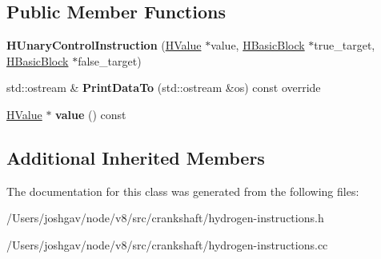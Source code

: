 \subsection*{Public Member Functions}
\begin{DoxyCompactItemize}
\item 
{\bfseries H\+Unary\+Control\+Instruction} (\hyperlink{classv8_1_1internal_1_1_h_value}{H\+Value} $\ast$value, \hyperlink{classv8_1_1internal_1_1_h_basic_block}{H\+Basic\+Block} $\ast$true\+\_\+target, \hyperlink{classv8_1_1internal_1_1_h_basic_block}{H\+Basic\+Block} $\ast$false\+\_\+target)\hypertarget{classv8_1_1internal_1_1_h_unary_control_instruction_ab4ddc5db204a0f1eab21b57189dea958}{}\label{classv8_1_1internal_1_1_h_unary_control_instruction_ab4ddc5db204a0f1eab21b57189dea958}

\item 
std\+::ostream \& {\bfseries Print\+Data\+To} (std\+::ostream \&os) const  override\hypertarget{classv8_1_1internal_1_1_h_unary_control_instruction_a1ca27e31ab76768681ce15c2f771503e}{}\label{classv8_1_1internal_1_1_h_unary_control_instruction_a1ca27e31ab76768681ce15c2f771503e}

\item 
\hyperlink{classv8_1_1internal_1_1_h_value}{H\+Value} $\ast$ {\bfseries value} () const \hypertarget{classv8_1_1internal_1_1_h_unary_control_instruction_a03e228936bec17339a767bef42537821}{}\label{classv8_1_1internal_1_1_h_unary_control_instruction_a03e228936bec17339a767bef42537821}

\end{DoxyCompactItemize}
\subsection*{Additional Inherited Members}


The documentation for this class was generated from the following files\+:\begin{DoxyCompactItemize}
\item 
/\+Users/joshgav/node/v8/src/crankshaft/hydrogen-\/instructions.\+h\item 
/\+Users/joshgav/node/v8/src/crankshaft/hydrogen-\/instructions.\+cc\end{DoxyCompactItemize}

